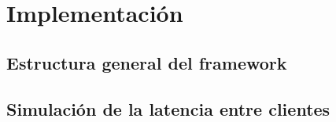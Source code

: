 \section{Implementación}


\subsection{Estructura general del framework}

% 

\subsection{Simulación de la latencia entre clientes}






